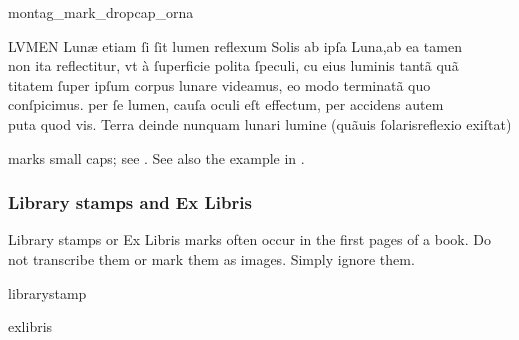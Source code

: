 \begin{sampleImage}{montag_mark_dropcap_orna}

\begin{typeLatin}
LVMEN Lunæ etiam ſi ſit lumen reflexum Solis ab ipſa Luna,\lwr ab ea tamen \\
non ita reflectitur, vt à ſuperficie polita ſpeculi, c\bs\tld{}u eius luminis tantã quã \\
titatem ſuper ipſum corpus lunare videamus,  eo modo terminatã quo \\
conſpicimus. per ſe lumen, cauſa oculi eſt effectum, per accidens autem \\
puta quod vis. Terra deinde nunquam lunari lumine (quãuis ſolaris\lwr reflexio exiſtat) \\
\someText {}
\end{typeLatin}
\end{sampleImage}

\vspace{-2mm}

\begin{crossref}
 marks small caps; see . See also the example in .
\end{crossref}

\subsubsection{Library stamps and Ex Libris}
\label{sec:library-stamps}

\begin{mainrule}
 Library stamps or Ex Libris marks often occur in the first pages of a book. Do not transcribe them or mark them as images. Simply ignore them.
\end{mainrule}

\begin{sampleImage}{librarystamp}
  \begin{typeLatin}
\notTranscribed
  \end{typeLatin}
\end{sampleImage}

\begin{sampleImage}[ 2: \, Ex Libris]{exlibris}
  \begin{typeLatin}
\notTranscribed
  \end{typeLatin}
\end{sampleImage}

